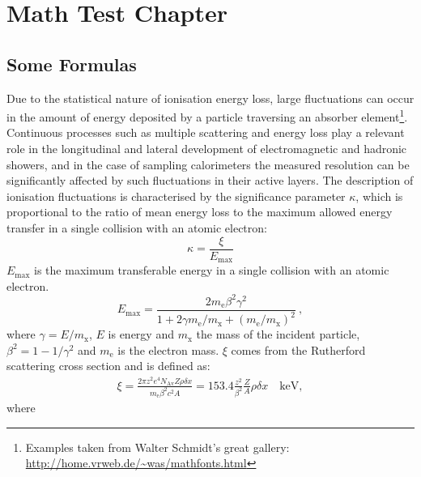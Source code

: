 
\chapter{Math Test Chapter} %

\label{ch:mathtest} %


\lipsum[13]


\section{Some Formulas}

Due to the statistical nature of ionisation energy loss, large fluctuations can occur in the amount of energy deposited by a particle traversing an absorber element\footnote{Examples taken from Walter Schmidt's great gallery: \\ \url{http://home.vrweb.de/~was/mathfonts.html}}.  Continuous processes such as multiple scattering and energy loss play a relevant role in the longitudinal and lateral development of electromagnetic and hadronic showers, and in the case of sampling calorimeters the measured resolution can be significantly affected by such fluctuations in their active layers.  The description of ionisation fluctuations is characterised by the significance parameter $\kappa$, which is proportional to the ratio of mean energy loss to the maximum allowed energy transfer in a single collision with an atomic electron: 
\begin{equation}
\kappa =\frac{\xi}{E_{\mathrm{max}}} %
\end{equation}
$E_{\mathrm{max}}$ is the maximum transferable energy in a single collision with an atomic electron.
\[E_{\mathrm{max}} =\frac{2 m_{\mathrm{e}} \beta^2\gamma^2 }{1 + 2\gamma m_{\mathrm{e}}/m_{\mathrm{x}} + \left ( m_{\mathrm{e}} /m_{\mathrm{x}}\right)^2}\ ,\]
where $\gamma = E/m_{\mathrm{x}}$, $E$ is energy and $m_{\mathrm{x}}$ the mass of the incident particle, $\beta^2 = 1 - 1/\gamma^2$ and $m_{\mathrm{e}}$ is the electron mass. $\xi$ comes from the Rutherford scattering cross section and is defined as:
\begin{eqnarray*} \xi  = \frac{2\pi z^2 e^4 N_{\mathrm{Av}} Z \rho
\delta x}{m_{\mathrm{e}} \beta^2 c^2 A} =  153.4 \frac{z^2}{\beta^2}
\frac{Z}{A}
\rho \delta x \quad\mathrm{keV},
\end{eqnarray*}
where

